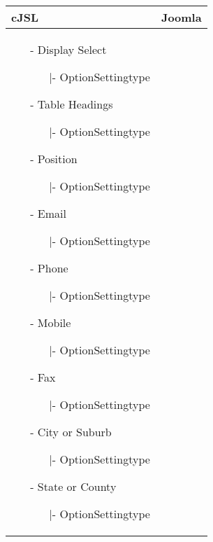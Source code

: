 \begin{minipage}{0.7\textwidth}
\begin{tabular}{|p{} | p{}|}
\hline
\textbf{cJSL} & \textbf{Joomla} \\ 
\hline
\begin{itemize}
		\item[-] Display Select
		\begin{enumerate}
	   			\item[|-] OptionSettingtype
	   		\end{enumerate}  
		\item[-] Table Headings
		\begin{enumerate}
   			\item[|-] OptionSettingtype
   		\end{enumerate} 
		\item[-] Position
			\begin{enumerate}
		   			\item[|-] OptionSettingtype
		   		\end{enumerate} 
		\item[-] Email
			\begin{enumerate}
		   			\item[|-] OptionSettingtype
		   		\end{enumerate} 
		\item[-] Phone
			\begin{enumerate}
		   			\item[|-] OptionSettingtype
		   		\end{enumerate} 
		\item[-] Mobile
			\begin{enumerate}
		   			\item[|-] OptionSettingtype
		   		\end{enumerate} 
		\item[-] Fax
			\begin{enumerate}
		   			\item[|-] OptionSettingtype
		   		\end{enumerate} 
		\item[-] City or Suburb
			\begin{enumerate}
		   			\item[|-] OptionSettingtype
		   		\end{enumerate} 
		\item[-] State or County
			\begin{enumerate}
		   			\item[|-] OptionSettingtype

\end{enumerate}
\end{itemize}
\end{tabular}
\end{minipage}
